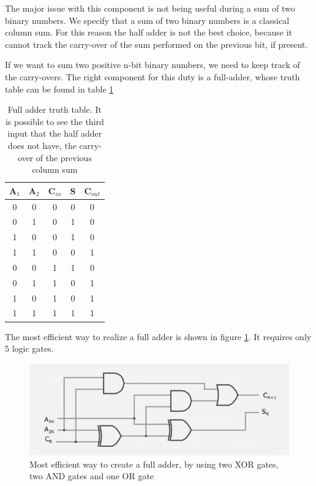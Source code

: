 \documentclass{article}
\begin{document}
The major issue with this component is not being useful during a sum of two binary numbers. We specify that a sum of two binary numbers is a classical column sum. For this reason the half adder is not the best choice, because it cannot track the carry-over of the sum performed on the previous bit, if present.

\vspace{5mm}

If we want to sum two positive n-bit binary numbers, we need to keep track of the carry-overs. The right component for this duty is a full-adder, whose truth table can be found in table \ref{FullAdderTT}

\begin{table}[h]
  \centering
  \begin{tabular}{| c | c | c || c | c |}
  \hline
  A$_1$ & A$_2$ & C$_{in}$ & S & C$_{out}$ \\ \hline
  0 & 0 & 0 & 0 & 0 \\ \hline
  0 & 1 & 0 & 1 & 0 \\ \hline
  1 & 0 & 0 & 1 & 0 \\ \hline
  1 & 1 & 0 & 0 & 1 \\ \hline
  0 & 0 & 1 & 1 & 0 \\ \hline
  0 & 1 & 1 & 0 & 1 \\ \hline
  1 & 0 & 1 & 0 & 1 \\ \hline
  1 & 1 & 1 & 1 & 1 \\ \hline
  \end{tabular}
  \caption{Full adder truth table. It is possible to see the third input that the half adder does not have, the carry-over of the previous column sum}
  \label{FullAdderTT}
\end{table}

The most efficient way to realize a full adder is shown in figure \ref{FullAdderCircuit}. It requires only 5 logic gates.

\begin{figure}[h]
  \centering
  \includegraphics[scale=0.6]{IM_full_adder_bis}
  \caption{Most efficient way to create a full adder, by using two XOR gates, two AND gates and one OR gate}
  \label{FullAdderCircuit}
\end{figure}
\end{document}
